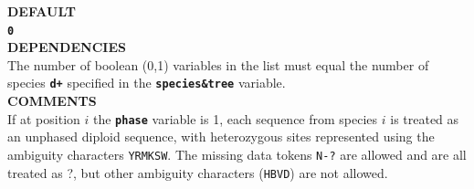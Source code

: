 \documentclass{book}
\numberwithin{equation}{section} \renewcommand{\baselinestretch}{0.55}
\begin{document}
\textbf{DEFAULT} \vspace{5pt}\\
\textbf{\texttt{0}} \vspace{5pt}\\
\textbf{DEPENDENCIES} \vspace{5pt}\\
The number of boolean (0,1) variables in the list must equal the number of species \textbf{\texttt{d+}} specified in the \textbf{\texttt{species\&tree}} variable. \vspace{5pt}\\
\textbf{COMMENTS} \vspace{5pt}\\
If at position $i$ the \textbf{\texttt{phase}} variable is 1, each
sequence from species $i$ is treated as an unphased diploid sequence,
with heterozygous sites represented using the ambiguity characters
\texttt{YRMKSW}.  The missing data tokens \texttt{N-?} are allowed and
are all treated as ?, but other ambiguity characters (\texttt{HBVD})
are not allowed.
\end{document}

